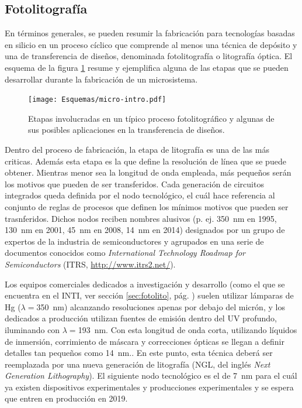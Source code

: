 	\subsection{Fotolitografía}

		En términos generales, se pueden resumir la fabricación para tecnologías basadas en silicio en un proceso cíclico que comprende al menos una técnica de depósito y una de transferencia de diseños, denominada fotolitografía o litografía óptica. El esquema de la figura \ref{fig:micro-intro} resume y ejemplifica alguna de las etapas que se pueden desarrollar durante la fabricación de un microsistema.
		
 			\begin{figure}[b!]
 				\begin{center}
 				\texttt{[image: Esquemas/micro-intro.pdf]}
 				\caption[Etapas de los procesos de microfabricación]{Etapas involucradas en un típico proceso fotolitográfico y algunas de sus posibles aplicaciones en la transferencia de diseños.}
 		   		\label{fig:micro-intro}
 		    	\end{center}
 		    	\end{figure}
	
		Dentro del proceso de fabricación, la etapa de litografía es una de las más criticas. Además esta etapa es la que define la resolución de línea que se puede obtener. Mientras menor sea la longitud de onda empleada, más pequeños serán los motivos que pueden de ser transferidos. Cada generación de circuitos integrados queda definida por el nodo tecnológico, el cuál hace referencia al conjunto de reglas de procesos que definen los mínimos motivos que pueden ser trasnferidos. Dichos nodos reciben nombres alusivos (p. ej. \SI{350}{nm} en 1995, \SI{130}{nm} en 2001, \SI{45}{nm} en 2008, \SI{14}{nm} en 2014) designados por un grupo de expertos de la industria de semiconductores y agrupados en una serie de documentos conocidos como \textit{International Technology Roadmap for Semiconductors} (ITRS, \url{http://www.itrs2.net/}).\cite{gargini2000}

		Los equipos comerciales dedicados a investigación y desarrollo (como el que se encuentra en el INTI, ver sección \ref{sec:fotolito}, pág. \pageref{sec:fotolito}) suelen utilizar lámparas de Hg ($\lambda=$\SI{350}{\nm}) alcanzando resoluciones apenas por debajo del micrón, y los dedicados a producción utilizan fuentes de emisión dentro del UV profundo, iluminando con $\lambda\!=$\SI{193}{\nm}. Con esta longitud de onda corta, utilizando líquidos de inmersión, corrimiento de máscara y correcciones ópticas se llegan a definir detalles tan pequeños como \SI{14}{\nm}.\cite{moore2006a}. En este punto, esta técnica deberá ser reemplazada por una nueva generación de litografía (NGL, del inglés \textit{Next Generation Lithography}).\cite{Asano2017,Schoot2017,Hasan2017,Naujok2017,Wan2017} El siguiente nodo tecnológico es el de \SI{7}{\nm} para el cuál ya existen dispositivos experimentales y producciones experimentales y se espera que entren en producción en 2019.\cite{Clinton2017,Chang2017}

